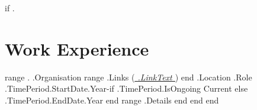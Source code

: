 {{if .}}
\section{Work Experience}
    \resumeSubHeadingListStart
    {{range .}}
    \resumeSubheading
        { {{.Organisation}} {{range .Links}} (\href{ {{.LinkURL}} }{\emph{\underline{ {{.LinkText}} }}}) {{end}} }{ {{.Location}} }
        { {{.Role}} }{ {{.TimePeriod.StartDate.Year}}-{{if .TimePeriod.IsOngoing}} Current {{else}} {{.TimePeriod.EndDate.Year}} {{end}} }
            \resumeItemListStart
            {{range .Details}}
            {{end}}
            \resumeItemListEnd
      {{end}}
\vspace{-16pt}
{{end}}